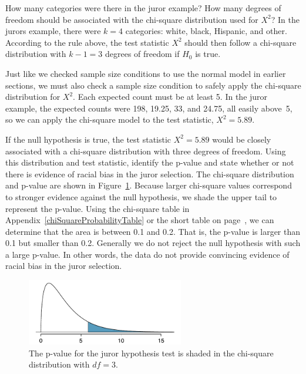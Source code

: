 \begin{example}{How many categories were there in the juror example? How many degrees of freedom should be associated with the chi-square distribution used for $X^2$?}
In the jurors example, there were $k=4$ categories: white, black, Hispanic, and other. According to the rule above, the test statistic $X^2$ should then follow a chi-square distribution with $k-1 = 3$ degrees of freedom if $H_0$ is true.
\end{example}

Just like we checked sample size conditions to use the normal model in earlier sections, we must also check a sample size condition to safely apply the chi-square distribution for $X^2$. Each expected count must be at least 5. In the juror example, the expected counts were 198, 19.25, 33, and 24.75, all easily above~5, so we can apply the chi-square model to the test statistic, $X^2=5.89$.

\begin{example}{If the null hypothesis is true, the test statistic $X^2=5.89$ would be closely associated with a chi-square distribution with three degrees of freedom. Using this distribution and test statistic, identify the p-value and state whether or not there is evidence of racial bias in the juror selection.}
The chi-square distribution and p-value are shown in Figure~\ref{jurorHTPValueShown}. Because larger chi-square values correspond to stronger evidence against the null hypothesis, we shade the upper tail to represent the p-value. Using the chi-square table in Appendix~\ref{chiSquareProbabilityTable} or the short table on page~\pageref{chiSquareProbabilityTableShort}, we can determine that the area is between 0.1 and 0.2. That is, the p-value is larger than 0.1 but smaller than 0.2. Generally we do not reject the null hypothesis with such a large p-value. In other words, the data do not provide convincing evidence of racial bias in the juror selection.
\end{example}

\begin{figure}[h]
\centering
\includegraphics[width=0.61\textwidth]{ch_inference_for_props/figures/jurorHTPValueShown/jurorHTPValueShown}
\caption{The p-value for the juror hypothesis test is shaded in the chi-square distribution with $df=3$.}
\label{jurorHTPValueShown}
\end{figure}

